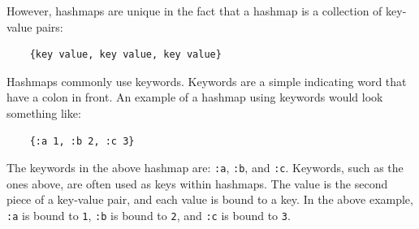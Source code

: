 \documentclass[12pt]{article}
\newcommand{\comment}[1]{{\bf \tt  {#1}}}
\newcommand{\emcomment}[1]{\textcolor{ForestGreen}{\comment{Elena: {#1}}}}
\begin{document}


However, hashmaps are unique in the fact that a hashmap is a collection of key-value pairs: 
\begin{verbatim}
	{key value, key value, key value}
\end{verbatim}

Hashmaps commonly use keywords. Keywords are a simple indicating word that have a colon in front.
An example of a hashmap using keywords would look something like: 
\begin{verbatim}
	{:a 1, :b 2, :c 3}
\end{verbatim}

The keywords in the above hashmap are: \texttt{:a}, \texttt{:b}, and \texttt{:c}. Keywords, such as the
ones above, are often used as keys within hashmaps. The value is the second piece of a key-value pair,
and each value is bound to a key. In the above example, \texttt{:a} is bound to \texttt{1},
\texttt{:b} is bound to \texttt{2}, and \texttt{:c} is bound to \texttt{3}.
\end{document}

